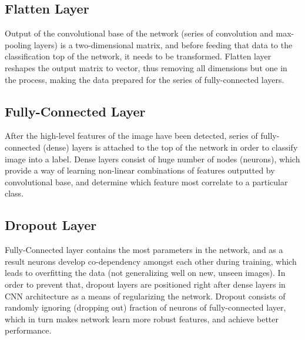 \subsection{Flatten Layer}

Output of the convolutional base of the network (series of convolution and max-pooling layers) is a two-dimensional matrix, and before feeding that data to the classification top of the network, it needs to be transformed. Flatten layer reshapes the output matrix to vector, thus removing all dimensions but one in the process, making the data prepared for the series of fully-connected layers.

\subsection{Fully-Connected Layer}

After the high-level features of the image have been detected, series of fully-connected (dense) layers is attached to the top of the network in order to classify image into a label. Dense layers consist of huge number of nodes (neurons), which provide a way of learning non-linear combinations of features outputted by convolutional base, and determine which feature most correlate to a particular class.

\subsection{Dropout Layer}

Fully-Connected layer contains the most parameters in the network, and as a result neurons develop co-dependency amongst each other during training, which leads to overfitting the data (not generalizing well on new, unseen images). In order to prevent that, dropout layers are positioned right after dense layers in CNN architecture as a means of regularizing the network. Dropout consists of randomly ignoring (dropping out) fraction of neurons of fully-connected layer, which in turn makes network learn more robust features, and achieve better performance.
\clearpage
